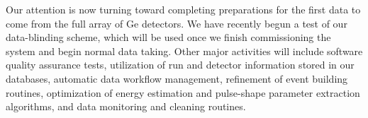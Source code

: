 Our attention is now turning toward completing preparations for the first data to come from the full array of Ge detectors. We have recently begun a test of our data-blinding scheme, which will be used once we finish commissioning the system and begin normal data taking. Other major activities will include software quality assurance tests, utilization of run and detector information stored in our databases, automatic data workflow management, refinement of event building routines, optimization of energy estimation and pulse-shape parameter extraction algorithms, and data monitoring and cleaning routines.
